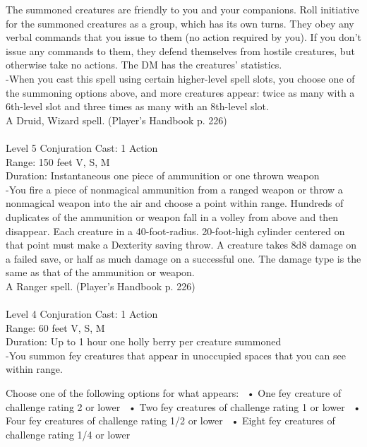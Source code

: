 \documentclass[10pt,twocolumn]{report}
\begin{document}
The summoned creatures are friendly to you and your companions. Roll initiative for the summoned creatures as a group, which has its own turns. They obey any verbal commands that you issue to them (no action required by you). If you don’t issue any commands to them, they defend themselves from hostile creatures, but otherwise take no actions. 
The DM has the creatures’ statistics.\\
-When you cast this spell using certain higher-level spell slots, you choose one of the summoning options above, and more creatures appear: twice as many with a 6th-level slot and three times as many with an 8th-level slot.\\
A Druid, Wizard spell. (Player's Handbook p. 226) \\


 \\
Level 5 \quad Conjuration \quad Cast: 1 Action\\
Range: 150 feet \quad V, S, M \\
Duration: Instantaneous \quad one piece of ammunition or one thrown weapon\\
-You fire a piece of nonmagical ammunition from a ranged weapon or throw a nonmagical weapon into the air and choose a point within range. 
Hundreds of duplicates of the ammunition or weapon fall in a volley from above and then disappear. Each creature in a 40-foot-radius. 20-foot-high cylinder centered on that point must make a Dexterity saving throw. A creature takes 8d8 damage on a failed save, or half as much damage on a successful one. The damage type is the same as that of the ammunition or weapon.\\
A Ranger spell. (Player's Handbook p. 226) \\


 \\
Level 4 \quad Conjuration \quad Cast: 1 Action\\
Range: 60 feet \quad V, S, M \\
Duration: Up to 1 hour \quad one holly berry per creature summoned\\
-You summon fey creatures that appear in unoccupied spaces that you can see within range. 

Choose one of the following options for what appears: 
 •  One fey creature of challenge rating 2 or lower 
 •  Two fey creatures of challenge rating 1 or lower 
 •  Four fey creatures of challenge rating 1/2 or lower 
 •  Eight fey creatures of challenge rating 1/4 or lower 
\end{document}
